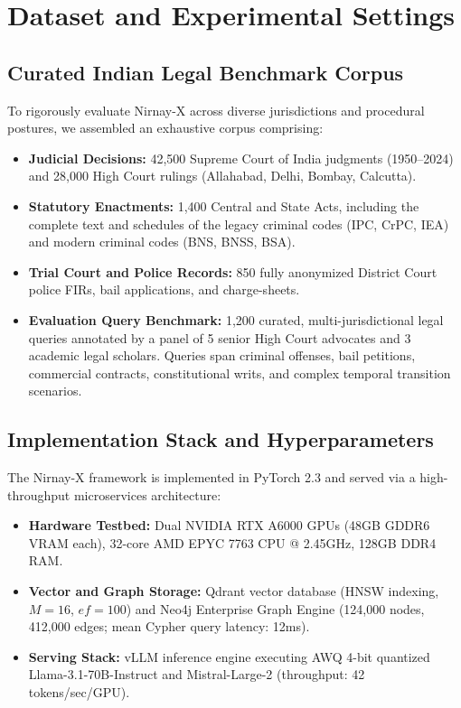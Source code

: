 \documentclass[conference]{IEEEtran}
\begin{document}
\section{Dataset and Experimental Settings}

\subsection{Curated Indian Legal Benchmark Corpus}
To rigorously evaluate Nirnay-X across diverse jurisdictions and procedural postures, we assembled an exhaustive corpus comprising:
\begin{itemize}
    \item \textbf{Judicial Decisions:} 42,500 Supreme Court of India judgments (1950--2024) and 28,000 High Court rulings (Allahabad, Delhi, Bombay, Calcutta).
    \item \textbf{Statutory Enactments:} 1,400 Central and State Acts, including the complete text and schedules of the legacy criminal codes (IPC, CrPC, IEA) and modern criminal codes (BNS, BNSS, BSA).
    \item \textbf{Trial Court and Police Records:} 850 fully anonymized District Court police FIRs, bail applications, and charge-sheets.
    \item \textbf{Evaluation Query Benchmark:} 1,200 curated, multi-jurisdictional legal queries annotated by a panel of 5 senior High Court advocates and 3 academic legal scholars. Queries span criminal offenses, bail petitions, commercial contracts, constitutional writs, and complex temporal transition scenarios.
\end{itemize}

\subsection{Implementation Stack and Hyperparameters}
The Nirnay-X framework is implemented in PyTorch 2.3 and served via a high-throughput microservices architecture:
\begin{itemize}
    \item \textbf{Hardware Testbed:} Dual NVIDIA RTX A6000 GPUs (48GB GDDR6 VRAM each), 32-core AMD EPYC 7763 CPU @ 2.45GHz, 128GB DDR4 RAM.
    \item \textbf{Vector and Graph Storage:} Qdrant vector database (HNSW indexing, $M=16$, $ef=100$) and Neo4j Enterprise Graph Engine (124,000 nodes, 412,000 edges; mean Cypher query latency: 12ms).
    \item \textbf{Serving Stack:} vLLM inference engine executing AWQ 4-bit quantized Llama-3.1-70B-Instruct and Mistral-Large-2 (throughput: 42 tokens/sec/GPU).
\end{itemize}
\end{document}
